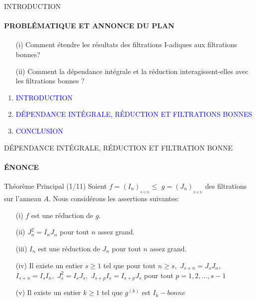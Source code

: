 \documentclass[11pt,a4paper]{beamer}
\begin{document}
\begin{frame}{INTRODUCTION}
	\framesubtitle{PROBLÉMATIQUE ET ANNONCE DU PLAN}
	\begin{block}{}
		\begin{enumerate}
			\item[(i)] Comment étendre les résultats des filtrations I-adiques aux filtrations bonnes?
			\item[(ii)] Comment la dépendance intégrale et la réduction interagissent-elles avec les filtrations bonnes ?
		\end{enumerate}
	\end{block}
\end{frame}

\begin{frame}
\begin{enumerate}
\item<0> \textcolor{blue}{INTRODUCTION}\\
\item<1> \textcolor{blue}{DÉPENDANCE INTÉGRALE, RÉDUCTION ET FILTRATIONS BONNES }\\
\item<0> \textcolor{blue}{CONCLUSION}\\
\end{enumerate}
\end{frame}

\begin{frame}{DÉPENDANCE INTÉGRALE, RÉDUCTION ET FILTRATION BONNE}
	\framesubtitle{ÉNONCE}
	\begin{block}{Théorème Principal (1/11)}
	Soient $f=(I_{n})_{_{n\in \mathbb{N}}}\leq $ $g=(J_{n})_{_{n\in \mathbb{N}}}$ des filtrations sur l'anneau $A.$ Nous considérons les assertions suivantes:
		\begin{enumerate}
			\item[(i)] $f$ est une réduction de $g.$
			\item[(ii)] $J_{n}^{2}=I_{n}J_{n}$ pour tout $n$ assez grand.
			\item[(iii)] $I_{n}$ est une réduction de $J_{n}$ pour tout $n$ assez grand.
			\item[(iv)] Il existe un entier $s\geq 1$ tel que pour tout $n\geq s,$ $J_{s+n}=J_{s}J_{n},$
			$I_{s+n}=I_{s}I_{n},$ $J_{s}^{2}=I_{s}J_{s},$ $J_{s+p}I_{s}=I_{s+p}J_{s}$ pour tout $p=1,2,...,s-1$
			\item[(v)] Il existe un entier $k\geq 1$ tel que $g^{(k)}$ est $I_{k}-bonne$
		\end{enumerate}
	\end{block}
\end{frame}
\end{document}
